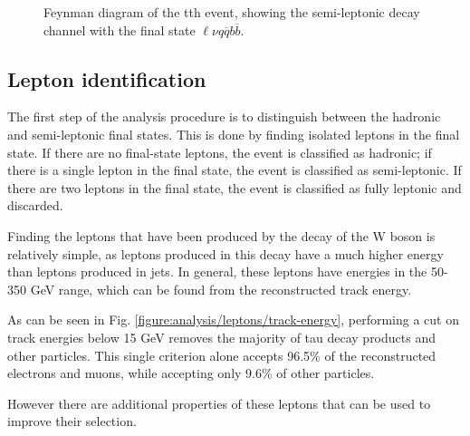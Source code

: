 \begin{figure}
	\caption{Feynman diagram of the tth event, showing the semi-leptonic decay channel  with the final state $\ell\nu q\overline{q}b\overline{b}$.}
	\label{figure:physics/SM/feynman-tth-semileptonic}
\end{figure}

\subsection{Lepton identification}
The first step of the analysis procedure is to distinguish between the hadronic and semi-leptonic final states. This is done by finding isolated leptons in the final state. If there are no final-state leptons, the event is classified as hadronic; if there is a single lepton in the final state, the event is classified as semi-leptonic. If there are two leptons in the final state, the event is classified as fully leptonic and discarded.

Finding the leptons that have been produced by the decay of the W boson is relatively simple, as leptons produced in this decay have a much higher energy than leptons produced in jets. In general, these leptons have energies in the 50-350 GeV range, which can be found from the reconstructed track energy.

As can be seen in Fig. \ref{figure:analysis/leptons/track-energy}, performing a cut on track energies below 15 GeV removes the majority of tau decay products and other particles. This single criterion alone accepts 96.5\% of the reconstructed electrons and muons, while accepting only 9.6\% of other particles. 

However there are additional properties of these leptons that can be used to improve their selection.

